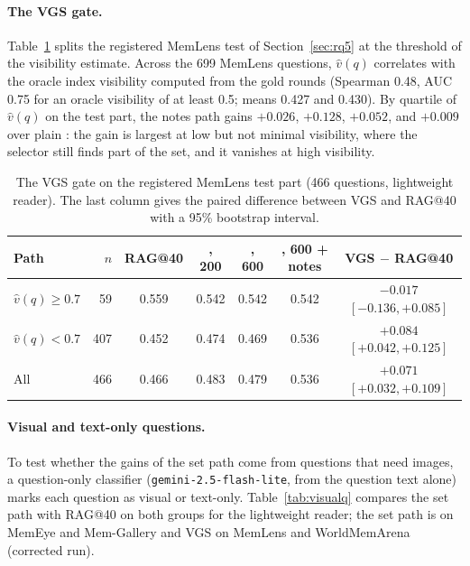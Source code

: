 \paragraph{The VGS gate.} Table~\ref{tab:gate} splits the registered MemLens test of Section~\ref{sec:rq5} at the threshold of the visibility estimate. Across the 699 MemLens questions, $\hat{v}(q)$ correlates with the oracle index visibility computed from the gold rounds (Spearman 0.48, AUC 0.75 for an oracle visibility of at least 0.5; means 0.427 and 0.430). By quartile of $\hat{v}(q)$ on the test part, the notes path gains $+0.026$, $+0.128$, $+0.052$, and $+0.009$ over plain \qss{}: the gain is largest at low but not minimal visibility, where the selector still finds part of the set, and it vanishes at high visibility.

\begin{table}[h]
\centering
\caption{The VGS gate on the registered MemLens test part (466 questions, lightweight reader). The last column gives the paired difference between VGS and RAG@40 with a 95\% bootstrap interval.}
\label{tab:gate}
\small
\begin{tabular}{lrccccc}
\toprule
Path & $n$ & RAG@40 & \qss{}, 200 & \qss{}, 600 & \qss{}, 600 + notes & VGS $-$ RAG@40 \\
\midrule
$\hat{v}(q)\ge0.7$ & 59 & 0.559 & 0.542 & 0.542 & 0.542 & $-0.017$ $[-0.136, +0.085]$ \\
$\hat{v}(q)<0.7$ & 407 & 0.452 & 0.474 & 0.469 & 0.536 & $+0.084$ $[+0.042, +0.125]$ \\
All & 466 & 0.466 & 0.483 & 0.479 & 0.536 & $+0.071$ $[+0.032, +0.109]$ \\
\bottomrule
\end{tabular}
\end{table}

\paragraph{Visual and text-only questions.} To test whether the gains of the set path come from questions that need images, a question-only classifier (\texttt{gemini-2.5-flash-lite}, from the question text alone) marks each question as visual or text-only. Table~\ref{tab:visualq} compares the set path with RAG@40 on both groups for the lightweight reader; the set path is \qss{} on MemEye and Mem-Gallery and VGS on MemLens and WorldMemArena (corrected run).

